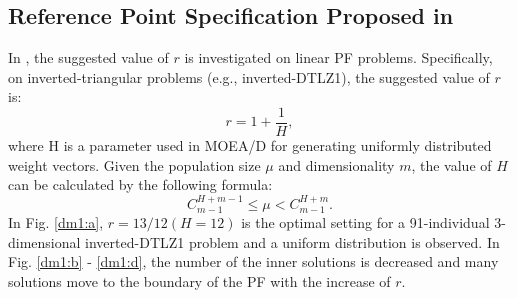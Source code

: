 \documentclass[conference]{IEEEtran}
\begin{document}
%
\subsection{Reference Point Specification Proposed in \cite{hisao:RPhowtoSpecify}}
In \cite{hisao:RPexplanation, hisao:RPhowtoSpecify, hisao:RPspecify}, the suggested value of $r$ is investigated 
on linear PF problems. 
Specifically, on inverted-triangular problems (e.g., inverted-DTLZ1\cite{hisao:RPexplanation}), 
the suggested value of $r$ is: 
\begin{equation}\label{eod}
  r=1+\frac{1}{H},
\end{equation}
where H is a parameter used in MOEA/D\cite{MOEAD} for 
generating uniformly distributed weight vectors\cite{hisao:dynamic}. 
Given the population size $\mu$ and dimensionality $m$, the value of $H$ can be calculated by the following formula:
\begin{equation}
  C^{H+m-1}_{m-1} \leq \mu < C^{H+m}_{m-1}.
\end{equation}
In Fig. \ref{dm1:a}, $r=13/12 (H=12)$ is the optimal setting for a 91-individual 3-dimensional 
inverted-DTLZ1 problem and a uniform distribution is observed. 
In Fig. \ref{dm1:b} - \ref{dm1:d}, the number of the inner solutions is decreased and many solutions move to 
the boundary of the PF with the increase of $r$. 
\end{document}
